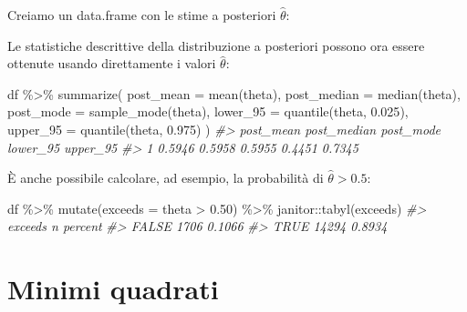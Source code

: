 \documentclass[
  11pt,
]{krantz}
\makeatletter
\newenvironment{Shaded}{\begin{snugshade}}{\end{snugshade}}
\newcommand{\AttributeTok}[1]{\textcolor[rgb]{0.61,0.61,0.61}{#1}}
\newcommand{\CommentTok}[1]{\textcolor[rgb]{0.37,0.37,0.37}{\textit{#1}}}
\newcommand{\FloatTok}[1]{\textcolor[rgb]{0.06,0.06,0.06}{#1}}
\newcommand{\FunctionTok}[1]{\textcolor[rgb]{0,0,0}{#1}}
\newcommand{\NormalTok}[1]{#1}
\newcommand{\OtherTok}[1]{\textcolor[rgb]{0.37,0.37,0.37}{#1}}
\newcommand{\SpecialCharTok}[1]{\textcolor[rgb]{0,0,0}{#1}}
\newenvironment{kframe}{%
\medskip{}
\setlength{\fboxsep}{.8em}
 \def\at@end@of@kframe{}%
 \ifinner\ifhmode%
  \def\at@end@of@kframe{\end{minipage}}%
  \begin{minipage}{\columnwidth}%
 \fi\fi%
 \def\FrameCommand##1{\hskip\@totalleftmargin \hskip-\fboxsep
 \colorbox{shadecolor}{##1}\hskip-\fboxsep
     \hskip-\linewidth \hskip-\@totalleftmargin \hskip\columnwidth}%
 \MakeFramed {\advance\hsize-\width
   \@totalleftmargin\z@ \linewidth\hsize
   \@setminipage}}%
 {\par\unskip\endMakeFramed%
 \at@end@of@kframe}
\renewenvironment{Shaded}{\begin{kframe}}{\end{kframe}}
\theoremstyle{definition}
\theoremstyle{definition}
\theoremstyle{definition}
\theoremstyle{definition}
\theoremstyle{remark}
\makeatother
\begin{document}
Creiamo un data.frame con le stime a posteriori \(\hat{\theta}\):

\begin{Shaded}
\end{Shaded}

Le statistiche descrittive della distribuzione a posteriori possono ora essere ottenute usando direttamente i valori \(\hat{\theta}\):

\begin{Shaded}
\begin{Highlighting}[]
\NormalTok{df }\SpecialCharTok{\%\textgreater{}\%} 
  \FunctionTok{summarize}\NormalTok{(}
    \AttributeTok{post\_mean =} \FunctionTok{mean}\NormalTok{(theta), }
    \AttributeTok{post\_median =} \FunctionTok{median}\NormalTok{(theta),}
    \AttributeTok{post\_mode =} \FunctionTok{sample\_mode}\NormalTok{(theta),}
    \AttributeTok{lower\_95 =} \FunctionTok{quantile}\NormalTok{(theta, }\FloatTok{0.025}\NormalTok{),}
    \AttributeTok{upper\_95 =} \FunctionTok{quantile}\NormalTok{(theta, }\FloatTok{0.975}\NormalTok{)}
\NormalTok{  )}
\CommentTok{\#\textgreater{}   post\_mean post\_median post\_mode lower\_95 upper\_95}
\CommentTok{\#\textgreater{} 1    0.5946      0.5958    0.5955   0.4451   0.7345}
\end{Highlighting}
\end{Shaded}

È anche possibile calcolare, ad esempio, la probabilità di \(\hat{\theta} > 0.5\):

\begin{Shaded}
\begin{Highlighting}[]
\NormalTok{df }\SpecialCharTok{\%\textgreater{}\%} 
  \FunctionTok{mutate}\NormalTok{(}\AttributeTok{exceeds =}\NormalTok{ theta }\SpecialCharTok{\textgreater{}} \FloatTok{0.50}\NormalTok{) }\SpecialCharTok{\%\textgreater{}\%} 
\NormalTok{  janitor}\SpecialCharTok{::}\FunctionTok{tabyl}\NormalTok{(exceeds)}
\CommentTok{\#\textgreater{}  exceeds     n percent}
\CommentTok{\#\textgreater{}    FALSE  1706  0.1066}
\CommentTok{\#\textgreater{}     TRUE 14294  0.8934}
\end{Highlighting}
\end{Shaded}

\hypertarget{least-squares}{%
\chapter{Minimi quadrati}\label{least-squares}}
\end{document}

